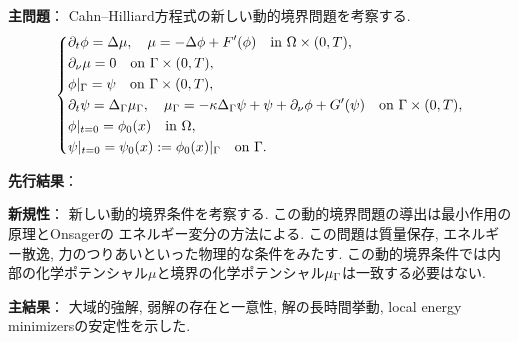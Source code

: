 \documentclass[a4paper]{article}
\begin{document}
{\bf 主問題}：
Cahn--Hilliard方程式の新しい動的境界問題を考察する.
\begin{equation}\left\{\begin{aligned}
	&\partial_t\phi = \Delta\mu,\quad \mu = -\Delta\phi + F'(\phi) \quad \text{in }\Omega\times(0,T),\\
	&\partial_{\nu}\mu = 0 \quad \text{on }\Gamma\times(0,T),\\
	&\phi|_{\Gamma} = \psi \quad \text{on }\Gamma\times(0,T),\\
	&\partial_t\psi = \Delta_{\Gamma}\mu_{\Gamma},\quad \mu_{\Gamma} = -\kappa\Delta_{\Gamma}\psi + \psi + \partial_{\nu}\phi + G'(\psi) \quad \text{on }\Gamma\times(0,T),\\
	&\phi|_{t=0} = \phi_0(x) \quad \text{in }\Omega,\\
	&\psi|_{t=0} = \psi_0(x) := \phi_0(x)|_{\Gamma} \quad \text{on }\Gamma.
\end{aligned}\right.\end{equation}

{\bf 先行結果}：

{\bf 新規性}：
新しい動的境界条件を考察する.
この動的境界問題の導出は最小作用の原理とOnsagerの
エネルギー変分の方法による.
この問題は質量保存, エネルギー散逸, 力のつりあいといった物理的な条件をみたす.
この動的境界条件では内部の化学ポテンシャル$\mu$と境界の化学ポテンシャル$\mu_{\Gamma}$は一致する必要はない.

{\bf 主結果}：
大域的強解, 弱解の存在と一意性, 解の長時間挙動, local energy minimizersの安定性を示した.
\end{document}
